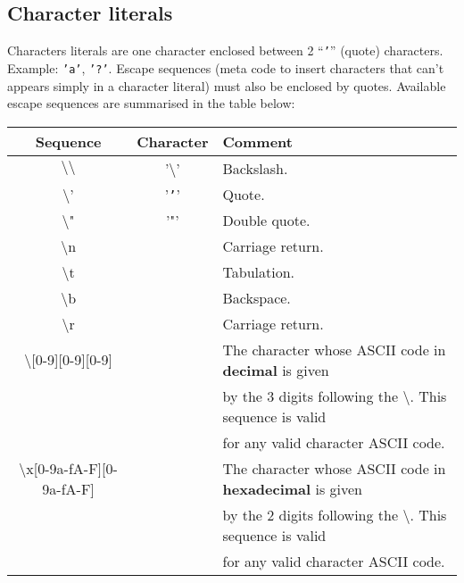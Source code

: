 


\subsection{Character literals}
\label{character literals}
\label{hexadecimal}
Characters literals are one character enclosed between 2 ``{\tt '}''
(quote) characters. Example: {\tt 'a'}, {\tt '?'}.
Escape sequences (meta code to insert characters that can't appears
simply in a character literal) must also be enclosed by
quotes. Available escape sequences are summarised in the table below:

\medskip
\noindent
\begin{tabular}{|c|c|l|}
  \hline
  Sequence & Character & Comment \\
  \hline
  $\setminus\setminus$ & '$\setminus$' & Backslash. \\
  \hline
  $\setminus$'         & '{\tt '}'  & Quote. \\
  \hline
  $\setminus$"         & '"'        & Double quote. \\
  \hline
  $\setminus$n         &            & Carriage return. \\
  \hline
  $\setminus$t         &            & Tabulation. \\
  \hline
  $\setminus$b         &            & Backspace. \\
  \hline
  $\setminus$r         &            & Carriage return. \\
  \hline
  $\setminus$[0-9][0-9][0-9] & & The character whose ASCII code in
                                {\bf decimal} is given \\
               &                  & by the 3 digits following the
                                  $\setminus$. This sequence is valid \\
               &                  & for any valid character
      ASCII code.\\
  \hline
  $\setminus$x[0-9a-fA-F][0-9a-fA-F] & & The character whose ASCII code in
                                {\bf hexadecimal} is given \\
               &                  & by the 2 digits following the
                                  $\setminus$. This sequence is valid \\
               &                  & for any valid character
      ASCII code.\\
  \hline
\end{tabular}



